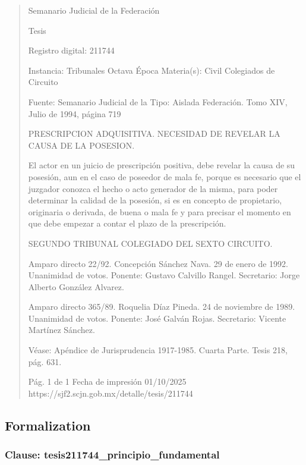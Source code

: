 \documentclass[11pt,a4paper]{article}
\begin{document}
\begin{quote}
                                                   Semanario Judicial de la Federación

                                                  Tesis

 Registro digital: 211744

 Instancia: Tribunales            Octava Época                         Materia(s): Civil
 Colegiados de Circuito

                                  Fuente: Semanario Judicial de la     Tipo: Aislada
                                  Federación.
                                  Tomo XIV, Julio de 1994, página
                                  719


PRESCRIPCION ADQUISITIVA. NECESIDAD DE REVELAR LA CAUSA DE LA POSESION.


El actor en un juicio de prescripción positiva, debe revelar la causa de su posesión, aun en el caso
de poseedor de mala fe, porque es necesario que el juzgador conozca el hecho o acto generador de
la misma, para poder determinar la calidad de la posesión, si es en concepto de propietario,
originaria o derivada, de buena o mala fe y para precisar el momento en que debe empezar a contar
el plazo de la prescripción.

SEGUNDO TRIBUNAL COLEGIADO DEL SEXTO CIRCUITO.


Amparo directo 22/92. Concepción Sánchez Nava. 29 de enero de 1992. Unanimidad de votos.
Ponente: Gustavo Calvillo Rangel. Secretario: Jorge Alberto González Alvarez.

Amparo directo 365/89. Roquelia Díaz Pineda. 24 de noviembre de 1989. Unanimidad de votos.
Ponente: José Galván Rojas. Secretario: Vicente Martínez Sánchez.

Véase: Apéndice de Jurisprudencia 1917-1985. Cuarta Parte. Tesis 218, pág. 631.




                                             Pág. 1 de 1             Fecha de impresión 01/10/2025
  https://sjf2.scjn.gob.mx/detalle/tesis/211744

\end{quote}

\subsection{Formalization}

\subsubsection{Clause: tesis211744\_principio\_fundamental}
\end{document}
